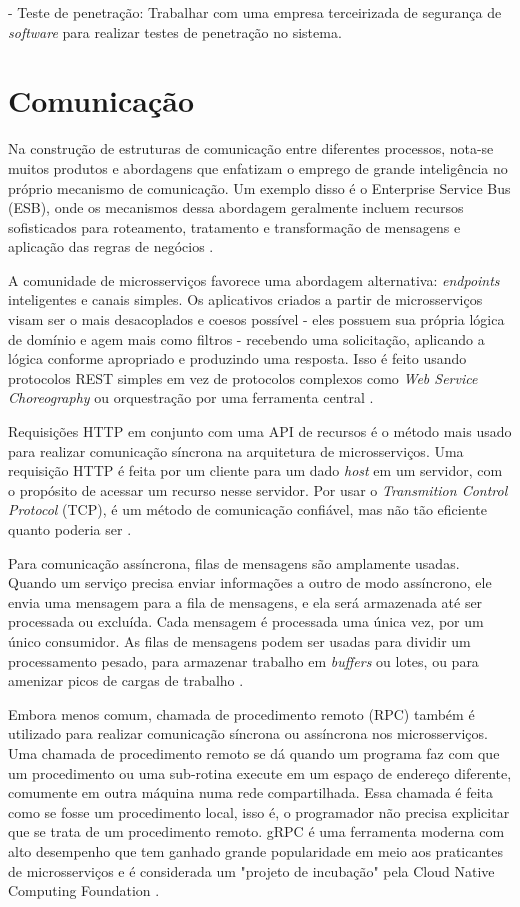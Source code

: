 - Teste de penetração: Trabalhar com uma empresa terceirizada de segurança de \emph{software} para realizar testes de penetração no sistema.

\section{Comunicação}

Na construção de estruturas de comunicação entre diferentes processos, nota-se muitos produtos e abordagens que enfatizam o emprego de grande inteligência no próprio mecanismo de comunicação. Um exemplo disso é o Enterprise Service Bus (ESB), onde os mecanismos dessa abordagem geralmente incluem recursos sofisticados para roteamento, tratamento e transformação de mensagens e aplicação das regras de negócios \cite{martin-fowler-microservices}.

A comunidade de microsserviços favorece uma abordagem alternativa: \emph{endpoints} inteligentes e canais simples. Os aplicativos criados a partir de microsserviços visam ser o mais desacoplados e coesos possível - eles possuem sua própria lógica de domínio e agem mais como filtros - recebendo uma solicitação, aplicando a lógica conforme apropriado e produzindo uma resposta. Isso é feito usando protocolos REST simples em vez de protocolos complexos como \emph{Web Service Choreography} ou orquestração por uma ferramenta central \cite{martin-fowler-microservices}.

Requisições HTTP em conjunto com uma API de recursos é o método mais usado para realizar comunicação síncrona na arquitetura de microsserviços. Uma requisição HTTP é feita por um cliente para um dado \emph{host} em um servidor, com o propósito de acessar um recurso nesse servidor. Por usar o \emph{Transmition Control Protocol} (TCP), é um método de comunicação confiável, mas não tão eficiente quanto poderia ser \cite{martin-fowler-microservices}.

Para comunicação assíncrona, filas de mensagens são amplamente usadas. Quando um serviço precisa enviar informações a outro de modo assíncrono, ele envia uma mensagem para a fila de mensagens, e ela será armazenada até ser processada ou excluída. Cada mensagem é processada uma única vez, por um único consumidor. As filas de mensagens podem ser usadas para dividir um processamento pesado, para armazenar trabalho em \emph{buffers} ou lotes, ou para amenizar picos de cargas de trabalho \cite{amazon-filas-de-mensagens}.

Embora menos comum, chamada de procedimento remoto (RPC) também é utilizado para realizar comunicação síncrona ou assíncrona nos microsserviços. Uma chamada de procedimento remoto se dá quando um programa faz com que um procedimento ou uma sub-rotina execute em um espaço de endereço diferente, comumente em outra máquina numa rede compartilhada. Essa chamada é feita como se fosse um procedimento local, isso é, o programador não precisa explicitar que se trata de um procedimento remoto. gRPC é uma ferramenta moderna com alto desempenho que tem ganhado grande popularidade em meio aos praticantes de microsserviços e é considerada um "projeto de incubação" pela Cloud Native Computing Foundation \cite{microsoft-grpc}.

